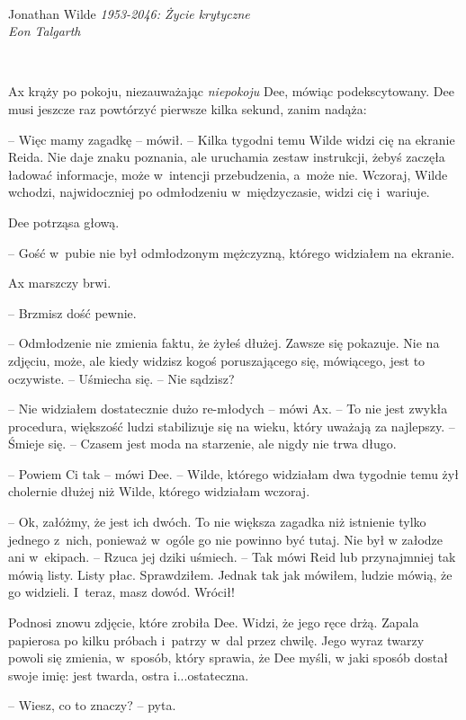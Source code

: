 \documentclass[oneside,polish,11pt,sfheadings]{mwbk}
\begin{document}
~

\begin{center}
Jonathan Wilde \emph{1953-2046: Życie krytyczne}\\
\emph{Eon Talgarth}
\end{center} 
~

Ax krąży po pokoju, niezauważając \emph{niepokoju} Dee, mówiąc
podekscytowany. Dee musi jeszcze raz powtórzyć pierwsze kilka sekund,
zanim nadąża: 

-- Więc mamy zagadkę -- mówił. -- Kilka tygodni temu Wilde
widzi cię na ekranie Reida. Nie daje znaku poznania, ale uruchamia
zestaw instrukcji, żebyś zaczęła ładować informacje, może w~intencji
przebudzenia, a~może nie. Wczoraj, Wilde wchodzi, najwidoczniej po
odmłodzeniu w~międzyczasie, widzi cię i~wariuje.

Dee potrząsa głową.

-- Gość w~pubie nie był odmłodzonym mężczyzną, którego widziałem na
ekranie.

Ax marszczy brwi. 

-- Brzmisz dość pewnie.

-- Odmłodzenie nie zmienia faktu, że żyłeś dłużej. Zawsze się pokazuje.
Nie na zdjęciu, może, ale kiedy widzisz kogoś poruszającego się,
mówiącego, jest to oczywiste. -- Uśmiecha się. -- Nie sądzisz?

-- Nie widziałem dostatecznie dużo re-młodych -- mówi Ax. -- To nie jest
zwykła procedura, większość ludzi stabilizuje się na wieku, który
uważają za najlepszy. -- Śmieje się. -- Czasem jest moda na starzenie, ale
nigdy nie trwa długo.

-- Powiem Ci tak -- mówi Dee. -- Wilde, którego widziałam dwa tygodnie temu
żył cholernie dłużej niż Wilde, którego widziałam wczoraj.

-- Ok, załóżmy, że jest ich dwóch. To nie większa zagadka niż istnienie
tylko jednego z~nich, ponieważ w~ogóle go nie powinno być tutaj. Nie był
w załodze ani w~ekipach. -- Rzuca jej dziki uśmiech. -- Tak mówi Reid lub
przynajmniej tak mówią listy. Listy płac. Sprawdziłem. Jednak tak jak
mówiłem, ludzie mówią, że go widzieli. I~teraz, masz dowód. Wrócił!

Podnosi znowu zdjęcie, które zrobiła Dee. Widzi, że jego ręce drżą.
Zapala papierosa po kilku próbach i~patrzy w~dal przez chwilę. Jego
wyraz twarzy powoli się zmienia, w~sposób, który sprawia, że Dee myśli,
w jaki sposób dostał swoje imię: jest twarda, ostra i...ostateczna.

-- Wiesz, co to znaczy? -- pyta.
\end{document}
